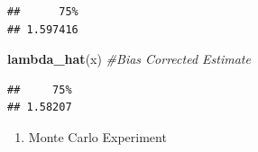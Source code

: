 \documentclass[
]{article}
\newenvironment{Shaded}{\begin{snugshade}}{\end{snugshade}}
\newcommand{\CommentTok}[1]{\textcolor[rgb]{0.56,0.35,0.01}{\textit{#1}}}
\newcommand{\FunctionTok}[1]{\textcolor[rgb]{0.13,0.29,0.53}{\textbf{#1}}}
\newcommand{\NormalTok}[1]{#1}
\providecommand{\tightlist}{%
  \setlength{\itemsep}{0pt}\setlength{\parskip}{0pt}}
\begin{document}
\begin{verbatim}
##      75% 
## 1.597416
\end{verbatim}

\begin{Shaded}
\begin{Highlighting}[]
\FunctionTok{lambda\_hat}\NormalTok{(x) }\CommentTok{\#Bias Corrected Estimate}
\end{Highlighting}
\end{Shaded}

\begin{verbatim}
##     75% 
## 1.58207
\end{verbatim}

\begin{enumerate}
\def\labelenumi{\arabic{enumi}.}
\setcounter{enumi}{2}
\tightlist
\item
  Monte Carlo Experiment
\end{enumerate}
\end{document}
